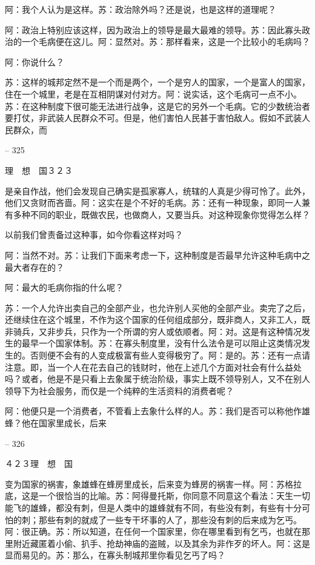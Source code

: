 \documentclass[11pt,oneside]{book}
\begin{document}
\begin{common-format}
    阿：我个人认为是这样。苏：政治除外吗？还是说，也是这样的道理呢？

    阿：政治上特别应该这样，因为政治上的领导是最大最难的领导。苏：因此寡头政治的一个毛病便在这儿。阿：显然对。苏：那样看来，这是一个比较小的毛病吗？

    阿：你说什么？

    苏：这样的城邦定然不是一个而是两个，一个是穷人的国家，一个是富人的国家，住在一个城里，老是在互相阴谋对付对方。阿：说实话，这个毛病可一点不小。苏：在这种制度下很可能无法进行战争，这是它的另外一个毛病。它的少数统治者要打仗，非武装人民群众不可。但是，他们害怕人民甚于害怕敌人。假如不武装人民群众，而

    

-- 325

    理　想　国３２３

    是亲自作战，他们会发现自己确实是孤家寡人，统辖的人真是少得可怜了。此外，他们又贪财而吝啬。阿：这实在是个不好的毛病。苏：还有一种现象，即同一人兼有多种不同的职业，既做农民，也做商人，又要当兵。对这种现象你觉得怎么样？

    以前我们曾责备过这种事，如今你看这样对吗？

    阿：当然不对。苏：让我们下面来考虑一下，这种制度是否最早允许这种毛病中之最大者存在的？

    阿：最大的毛病你指的什么呢？

    苏：一个人允许出卖自己的全部产业，也允许别人买他的全部产业。卖完了之后，还继续住在这个城里，不作为这个国家的任何组成部分，既非商人，又非工人，既非骑兵，又非步兵，只作为一个所谓的穷人或依顺者。阿：对。这是有这种情况发生的最早一个国家体制。苏：在寡头制度里，没有什么法令是可以阻止这类情况发生的。否则便不会有的人变成极富有些人变得极穷了。阿：是的。苏：还有一点请注意。即，当一个人在花去自己的钱财时，他在上述几个方面对社会有什么益处吗？或者，他是不是只看上去象属于统治阶级，事实上既不领导别人，又不在别人领导下为社会服务，而仅是一个纯粹的生活资料的消费者呢？

    阿：他便只是一个消费者，不管看上去象什么样的人。苏：我们是否可以称他作雄蜂？他在国家里成长，后来

    

-- 326

    ４２３理　想　国

    变为国家的祸害，象雄蜂在蜂房里成长，后来变为蜂房的祸害一样。阿：苏格拉底，这是一个很恰当的比喻。苏：阿得曼托斯，你同意不同意这个看法：天生一切能飞的雄蜂，都没有刺，但是人类中的雄蜂就有不同，有些没有刺，有些有十分可怕的刺；那些有刺的就成了一些专干坏事的人了，那些没有刺的后来成为乞丐。阿：很正确。苏：所以知道，在任何一个国家里，你在哪里看到有乞丐，也就在那里附近藏匿着小偷、扒手、抢劫神庙的盗贼，以及其余为非作歹的坏人。阿：这是显而易见的。苏：那么，在寡头制城邦里你看见乞丐了吗？


\end{common-format}
\end{document}
